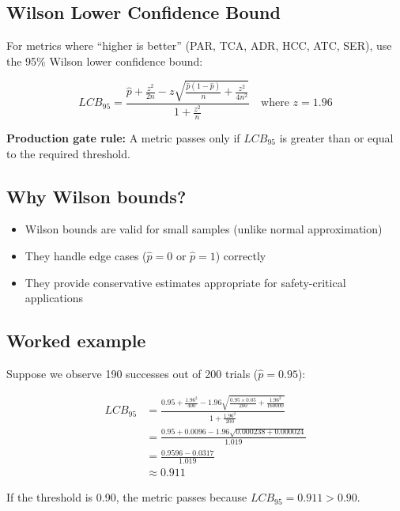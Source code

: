 \subsection{Wilson Lower Confidence Bound}

For metrics where ``higher is better'' (PAR, TCA, ADR, HCC, ATC, SER), use the
95\% Wilson lower confidence bound:

\begin{equation}
\boxed{
LCB_{95} = \frac{\hat{p} + \frac{z^2}{2n} - z\sqrt{\frac{\hat{p}(1-\hat{p})}{n} + \frac{z^2}{4n^2}}}{1 + \frac{z^2}{n}}
\quad \text{where } z = 1.96
}
\label{eq:wilson}
\end{equation}

\textbf{Production gate rule:} A metric passes only if $LCB_{95}$ is greater
than or equal to the required threshold.

\subsection{Why Wilson bounds?}

\begin{itemize}
  \item Wilson bounds are valid for small samples (unlike normal approximation)
  \item They handle edge cases ($\hat{p} = 0$ or $\hat{p} = 1$) correctly
  \item They provide conservative estimates appropriate for safety-critical
        applications
\end{itemize}

\subsection{Worked example}

Suppose we observe 190 successes out of 200 trials ($\hat{p} = 0.95$):

\begin{align*}
LCB_{95} &= \frac{0.95 + \frac{1.96^2}{400} - 1.96\sqrt{\frac{0.95 \times 0.05}{200} + \frac{1.96^2}{160000}}}{1 + \frac{1.96^2}{200}} \\
         &= \frac{0.95 + 0.0096 - 1.96\sqrt{0.000238 + 0.000024}}{1.019} \\
         &= \frac{0.9596 - 0.0317}{1.019} \\
         &\approx 0.911
\end{align*}

If the threshold is 0.90, the metric passes because $LCB_{95} = 0.911 > 0.90$.


